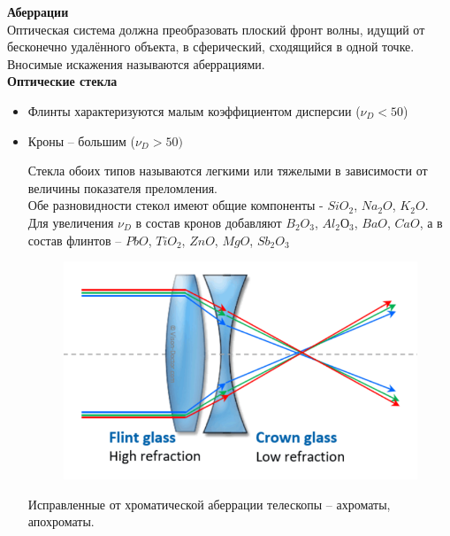 \documentclass[12pt]{article}
\begin{document}
\textbf{Аберрации}\\
Оптическая система должна преобразовать плоский
фронт волны, идущий от бесконечно удалённого объекта,
в сферический, сходящийся в одной точке.
Вносимые искажения называются аберрациями.\\
\textbf{Оптические стекла}
\begin{itemize}
	\item Флинты характеризуются
	малым коэффициентом дисперсии ($\nu_D <
	50$)
	\item Кроны -- большим ($\nu_D > 50)$
	
	Стекла обоих типов называются легкими или
	тяжелыми в зависимости от величины
	показателя преломления.\\
	Обе разновидности стекол имеют общие
	компоненты - $SiO_2$, $Na_2O$, $K_{2}O$.
	Для увеличения $\nu_D$ в состав кронов добавляют
	$B_2O_3$, $Al_2О_3$, $BaO$, $CaO$, а	
	в состав флинтов -- $PbO$, $TiO_2$, $ZnO$, $MgO$, $Sb_2O_3$	
	\begin{figure}[h]
		\centering
		\includegraphics[width=0.5\linewidth]{"Снимок экрана от 2024-12-22 18-23-56"}
	\end{figure}
	
	Исправленные от хроматической аберрации телескопы -- ахроматы,
	апохроматы.
	
\end{itemize}
\end{document}
